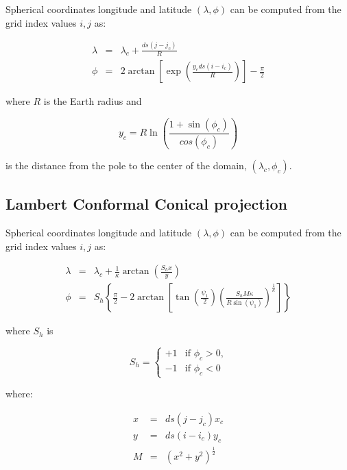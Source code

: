 Spherical coordinates longitude and latitude $(\lambda, \phi)$ can be computed
from the grid index values $i,j$ as:

\begin{eqnarray}
  \lambda &=& \lambda_c + \frac{ds \left(j-j_c\right)}{R} \\
  \phi &=& 2 \arctan\left[\exp\left(\frac{y_c ds\left(i-i_c\right)}{R}\right)
             \right]-\frac{\pi}{2}
\end{eqnarray}

where $R$ is the Earth radius and

\begin{equation}
  y_c = R \ln \left(\frac{1+\sin(\phi_c)}{cos(\phi_c)}\right)
\end{equation}

is the distance from the pole to the center of the domain, $(\lambda_c,\phi_c)$.

\subsection{Lambert Conformal Conical projection}

Spherical coordinates longitude and latitude $(\lambda, \phi)$ can be computed
from the grid index values $i,j$ as:

\begin{eqnarray}
  \lambda &=& \lambda_c +
         \frac{1}{\kappa}\arctan\left(\frac{S_h x}{y}\right) \\
   \phi &=& S_h \left\{ \frac{\pi}{2} - 
          2 \arctan\left[ \tan\left(\frac{\psi_1}{2}\right) \left(
         \frac{S_h M \kappa}{R \sin(\psi_1)}\right)^{\frac{1}{\kappa}}\right]
         \right\}
\end{eqnarray}

where $S_h$ is

\begin{equation}
  S_h = 
  \begin{cases}
    +1 & \text{if $\phi_c > 0$,} \\
    -1 & \text{if $\phi_c < 0$}
  \end{cases}
\end{equation}

where:

\begin{eqnarray}
  x &=& ds \left(j-j_c\right) x_c \\
  y &=& ds \left(i-i_c\right) y_c \\
  M &=& \left(x^2+y^2\right)^{\frac{1}{2}} \\
\end{eqnarray}

